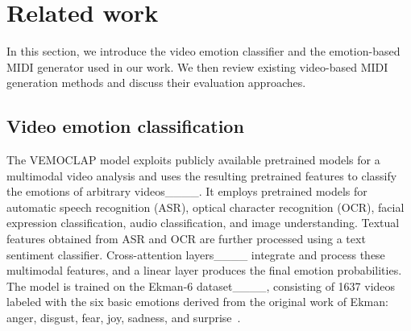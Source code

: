 \section{Related work}



In this section, we introduce the video emotion classifier and the emotion-based MIDI generator used in our work. We then review existing video-based MIDI generation methods and discuss their evaluation approaches.


\subsection{Video emotion classification}

The VEMOCLAP model exploits publicly available pretrained models for a multimodal video analysis and uses the resulting pretrained features to classify the emotions of arbitrary videos____. It employs pretrained models for automatic speech recognition (ASR), optical character recognition (OCR), facial expression classification, audio classification, and image understanding.
Textual features obtained from ASR and OCR are further processed using a text sentiment classifier. 
Cross-attention layers____ integrate and process these multimodal features, and a linear layer produces the final emotion probabilities. 
The model is trained on the Ekman-6 dataset____, consisting of 1637 videos labeled with the six basic emotions derived from the original work of Ekman: anger, disgust, fear, joy, sadness, and surprise~. 

